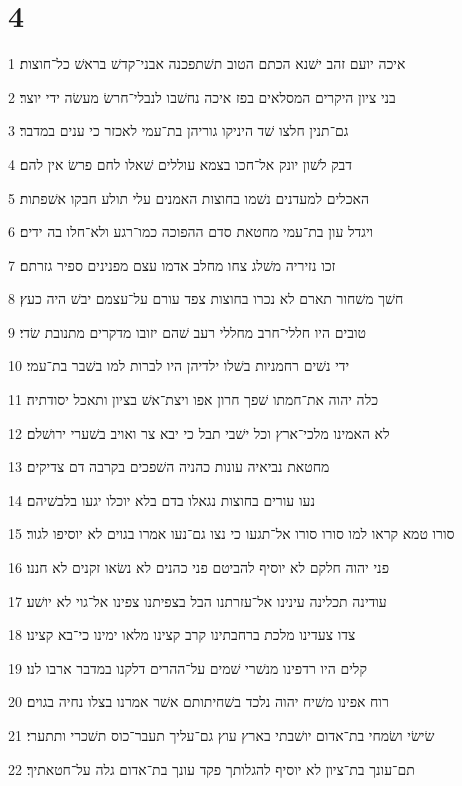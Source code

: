 \chapter{4}

\par 1 איכה יועם זהב ישׁנא הכתם הטוב תשׁתפכנה אבני־קדשׁ בראשׁ כל־חוצות׃
\par 2 בני ציון היקרים המסלאים בפז איכה נחשׁבו לנבלי־חרשׂ מעשׂה ידי יוצר׃
\par 3 גם־תנין חלצו שׁד היניקו גוריהן בת־עמי לאכזר כי ענים במדבר׃
\par 4 דבק לשׁון יונק אל־חכו בצמא עוללים שׁאלו לחם פרשׂ אין להם׃
\par 5 האכלים למעדנים נשׁמו בחוצות האמנים עלי תולע חבקו אשׁפתות׃
\par 6 ויגדל עון בת־עמי מחטאת סדם ההפוכה כמו־רגע ולא־חלו בה ידים׃
\par 7 זכו נזיריה משׁלג צחו מחלב אדמו עצם מפנינים ספיר גזרתם׃
\par 8 חשׁך משׁחור תארם לא נכרו בחוצות צפד עורם על־עצמם יבשׁ היה כעץ׃
\par 9 טובים היו חללי־חרב מחללי רעב שׁהם יזובו מדקרים מתנובת שׂדי׃
\par 10 ידי נשׁים רחמניות בשׁלו ילדיהן היו לברות למו בשׁבר בת־עמי׃
\par 11 כלה יהוה את־חמתו שׁפך חרון אפו ויצת־אשׁ בציון ותאכל יסודתיה׃
\par 12 לא האמינו מלכי־ארץ וכל ישׁבי תבל כי יבא צר ואויב בשׁערי ירושׁלם׃
\par 13 מחטאת נביאיה עונות כהניה השׁפכים בקרבה דם צדיקים׃
\par 14 נעו עורים בחוצות נגאלו בדם בלא יוכלו יגעו בלבשׁיהם׃
\par 15 סורו טמא קראו למו סורו סורו אל־תגעו כי נצו גם־נעו אמרו בגוים לא יוסיפו לגור׃
\par 16 פני יהוה חלקם לא יוסיף להביטם פני כהנים לא נשׂאו זקנים לא חננו׃
\par 17 עודינה תכלינה עינינו אל־עזרתנו הבל בצפיתנו צפינו אל־גוי לא יושׁע׃
\par 18 צדו צעדינו מלכת ברחבתינו קרב קצינו מלאו ימינו כי־בא קצינו׃
\par 19 קלים היו רדפינו מנשׁרי שׁמים על־ההרים דלקנו במדבר ארבו לנו׃
\par 20 רוח אפינו משׁיח יהוה נלכד בשׁחיתותם אשׁר אמרנו בצלו נחיה בגוים׃
\par 21 שׂישׂי ושׂמחי בת־אדום יושׁבתי בארץ עוץ גם־עליך תעבר־כוס תשׁכרי ותתערי׃
\par 22 תם־עונך בת־ציון לא יוסיף להגלותך פקד עונך בת־אדום גלה על־חטאתיך׃

